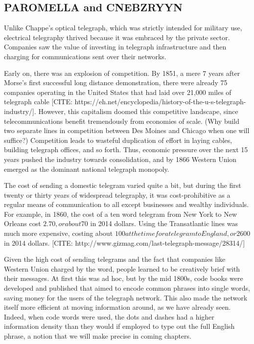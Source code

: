 \documentclass[UTF8]{book}
\begin{document}
\begin{CJK}{UTF8}{gbsn}
\section{PAROMELLA and CNEBZRYYN}

Unlike Chappe's optical telegraph, which was strictly intended for military use, electrical telegraphy thrived because it was embraced by the private sector. Companies saw the value of investing in telegraph infrastructure and then charging for communications sent over their networks.

Early on, there was an explosion of competition. By 1851, a mere 7 years after Morse's first successful long distance demonstration, there were already 75 companies operating in the United States that had laid over 21,000 miles of telegraph cable [CITE: https://eh.net/encyclopedia/history-of-the-u-s-telegraph-industry/]. However, this capitalism doomed this competitive landscape, since telecommunications benefit tremendously from economies of scale. (Why build two separate lines in competition between Des Moines and Chicago when one will suffice?) Competition leads to wasteful duplication of effort in laying cables, building telegraph offices, and so forth. Thus, economic pressure over the next 15 years pushed the industry towards consolidation, and by 1866 Western Union emerged as the dominant national telegraph monopoly.

The cost of sending a domestic telegram varied quite a bit, but during the first twenty or thirty years of widespread telegraphy, it was cost-prohibitive as a regular means of communication to all except businesses and wealthy individuals. For example, in 1860, the cost of a ten word telegram from New York to New Orleans cost $2.70, or about $70 in 2014 dollars. Using the Transatlantic lines was much more expensive, costing about $100 at the time for a telegram to England, or $2600 in 2014 dollars. [CITE: http://www.gizmag.com/last-telegraph-message/28314/]

Given the high cost of sending telegrams and the fact that companies like Western Union charged by the word, people learned to be creatively brief with their messages. At first this was ad hoc, but by the mid 1800s, code books were developed and published that aimed to encode common phrases into single words, saving money for the users of the telegraph network. This also made the network itself more efficient at moving information around, as we have already seen. Indeed, when code words were used, the dots and dashes had a higher information density than they would if employed to type out the full English phrase, a notion that we will make precise in coming chapters.


\end{CJK}
\end{document}
